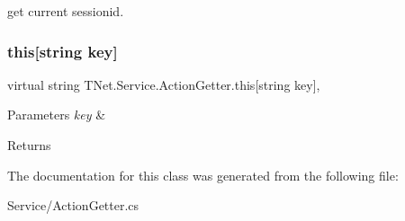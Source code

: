 get current sessionid. 

\mbox{\label{class_t_net_1_1_service_1_1_action_getter_a39997125aeffb62813680d6d33583567}} 
\subsubsection{\texorpdfstring{this[string key]}{this[string key]}}
{\footnotesize\ttfamily virtual string T\+Net.\+Service.\+Action\+Getter.\+this\mbox{[}string key\mbox{]}\hspace{0.3cm}{\ttfamily [get]}, {\ttfamily [set]}}






\begin{DoxyParams}{Parameters}
{\em key} & \\
\hline
\end{DoxyParams}
\begin{DoxyReturn}{Returns}

\end{DoxyReturn}


The documentation for this class was generated from the following file\+:\begin{DoxyCompactItemize}
\item 
Service/Action\+Getter.\+cs\end{DoxyCompactItemize}
